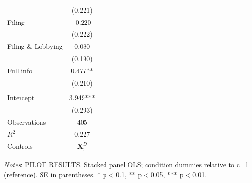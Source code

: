 \documentclass[11pt]{article}
\begin{document}
\begin{table}[!htbp]
\begin{threeparttable}
\begin{tabular}{l|c}
 & (0.221) \\
Filing & -0.220 \\
 & (0.222) \\
Filing \& Lobbying & 0.080 \\
 & (0.190) \\
Full info & 0.477** \\
 & (0.210) \\
\\[0.5em]
Intercept & 3.949*** \\
 & (0.293) \\
\midrule
Observations & 405 \\
$R^2$ & 0.227 \\
Controls & $\mathbf{X}_{i}^{D}$ \\
\bottomrule
\end{tabular}
\begin{tablenotes}[flushleft]
\footnotesize
\item \textit{Notes}: PILOT RESULTS. Stacked panel OLS; condition dummies relative to c=1 (reference). SE in parentheses. * p$<$0.1, ** p$<$0.05, *** p$<$0.01.
\end{tablenotes}
\end{threeparttable}
\end{table}
\end{document}
